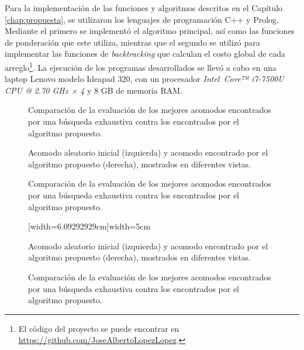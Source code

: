 Para la implementación de las funciones y algoritmos descritos en el Capítulo \ref{chap:propuesta}, se utilizaron los lenguajes de programación C++ y Prolog.
Mediante el primero se implementó el algoritmo principal, así como las funciones de ponderación que este utiliza, mientras que el segundo se utilizó para implementar las funciones de \textit{backtracking} que calculan el costo global de cada arreglo\footnote{El código del proyecto se puede encontrar en \url{https://github.com/JoseAlbertoLopezLopez}.}.
La ejecución de los programas desarrollados se llevó a cabo en una laptop Lenovo modelo Ideapad 320, con un procesador \textsl{Intel\,\raisebox{1.3pt}{\scriptsize\circledR} Core™ i7-7500U CPU @ 2.70 GHz × 4} y 8 GB de memoria RAM.
%
\pagebreak
%
\captionsetup[figure]{skip = 13pt}%
%
%
\newlength{\oldintextsep}%
\setlength{\oldintextsep}{\intextsep}%
\setlength\intextsep{9pt}%
%
\begin{figure}[H]
	\caption{Comparación de la evaluación de los mejores acomodos encontrados por una búsqueda exhaustiva contra los encontrados por el algoritmo propuesto.}%
\end{figure}
\vfill%
\begin{figure}[H]
	\caption{Acomodo aleatorio inicial (izquierda) y acomodo encontrado por el algoritmo propuesto (derecha), mostrados en diferentes vistas.}%
\end{figure}
%
\begin{figure}[H]
	\caption{Comparación de la evaluación de los mejores acomodos encontrados por una búsqueda exhaustiva contra los encontrados por el algoritmo propuesto.}%
\end{figure}
\vspace{7pt}%
\begin{figure}[H]
	[width=6.09292929cm]{width=5cm}%
	\caption{Acomodo aleatorio inicial (izquierda) y acomodo encontrado por el algoritmo propuesto (derecha), mostrados en diferentes vistas.}
\end{figure}
%
\begin{figure}[H]
	\caption{Comparación de la evaluación de los mejores acomodos encontrados por una búsqueda exhaustiva contra los encontrados por el algoritmo propuesto.}%
\end{figure}

